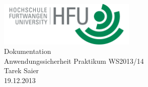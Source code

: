 \documentclass[pdftex,fontsize=11pt,a4paper]{scrbook}
\begin{document}
\begin{titlepage}
\thispagestyle{empty}
\begin{center}
\includegraphics[width=0.5\textwidth]{hfu.png}~\\[1.5cm]
\Huge Dokumentation\\[0.4cm]
\Huge Anwendungssicherheit Praktikum WS2013/14\\[1cm]
\LARGE Tarek Saier\\[0.2cm]
\normalsize 19.12.2013
\end{center}
\end{titlepage}
\end{document}
